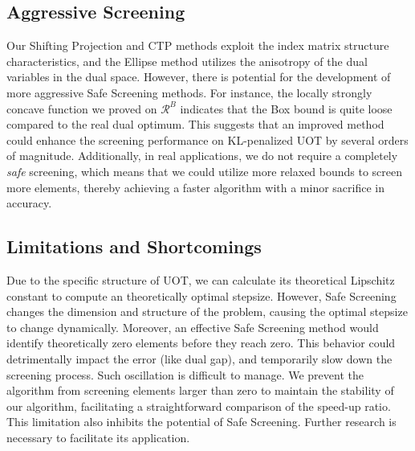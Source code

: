 \documentclass[11pt]{article}
\begin{document}
\subsection{Aggressive Screening}
Our Shifting Projection and CTP methods exploit the index matrix structure characteristics, and the Ellipse method utilizes the anisotropy of the dual variables in the dual space. However, there is potential for the development of more aggressive Safe Screening methods. For instance, the locally strongly concave function we proved on $\mathcal{R}^B$ indicates that the Box bound is quite loose compared to the real dual optimum. This suggests that an improved method could enhance the screening performance on KL-penalized UOT by several orders of magnitude. Additionally, in real applications, we do not require a completely \textit{safe} screening, which means that we could utilize more relaxed bounds to screen more elements, thereby achieving a faster algorithm with a minor sacrifice in accuracy.

\subsection{Limitations and Shortcomings}
Due to the specific structure of UOT, we can calculate its theoretical Lipschitz constant to compute an theoretically optimal stepsize. However, Safe Screening changes the dimension and structure of the problem, causing the optimal stepsize to change dynamically. Moreover, an effective Safe Screening method would identify theoretically zero elements before they reach zero. This behavior could detrimentally impact the error (like dual gap), and temporarily slow down the screening process. Such oscillation is difficult to manage. We prevent the algorithm from screening elements larger than zero to maintain the stability of our algorithm, facilitating a straightforward comparison of the speed-up ratio. This limitation also inhibits the potential of Safe Screening. Further research is necessary to facilitate its application.
\end{document}

